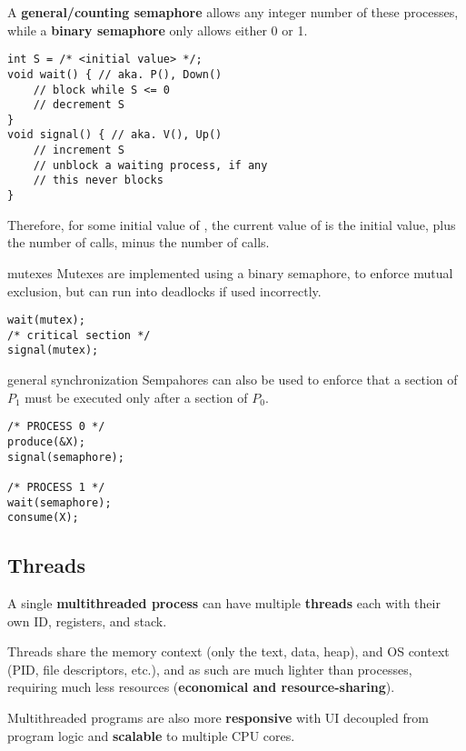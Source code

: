 A \textbf{general/counting semaphore} allows any integer number of these processes, while a \textbf{binary semaphore}
only allows either 0 or 1.

\begin{lstlisting}
int S = /* <initial value> */;
void wait() { // aka. P(), Down()
    // block while S <= 0
    // decrement S
}
void signal() { // aka. V(), Up()
    // increment S
    // unblock a waiting process, if any
    // this never blocks
}
\end{lstlisting}

Therefore, for some initial value of , the current value of  is the initial value, plus the number of  calls, minus the number of  calls.

\begin{defn}{mutexes}
    Mutexes are implemented using a binary semaphore, to enforce mutual exclusion, but can run into deadlocks if used incorrectly.
    \begin{lstlisting}
wait(mutex);
/* critical section */
signal(mutex);
    \end{lstlisting}
\end{defn}

\begin{defn}{general synchronization}
    Sempahores can also be used to enforce that a section of $P_1$ must be executed only after a section of $P_0$.

    \begin{lstlisting}
/* PROCESS 0 */
produce(&X);
signal(semaphore);

/* PROCESS 1 */
wait(semaphore);
consume(X);
    \end{lstlisting}
\end{defn}

\subsection{Threads}
A single \textbf{multithreaded process} can have multiple \textbf{threads} each with their own ID, registers, and stack.

Threads share the memory context (only the text, data, heap), and OS context (PID, file descriptors, etc.), and as such are much lighter than processes, requiring much less resources (\textbf{economical and resource-sharing}).

Multithreaded programs are also more \textbf{responsive} with UI decoupled from program logic and \textbf{scalable} to multiple CPU cores.

